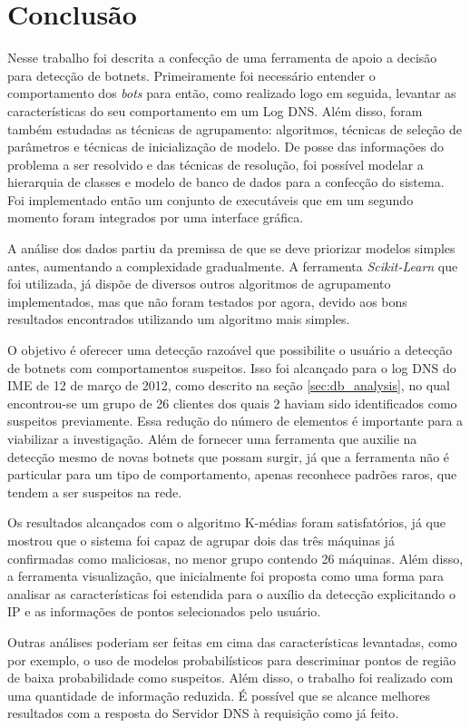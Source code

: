\chapter{Conclusão}

Nesse trabalho foi descrita a confecção de uma ferramenta de apoio a decisão para detecção de botnets. Primeiramente foi necessário entender o comportamento dos \textit{bots} para então, como realizado logo em seguida, levantar as características do seu comportamento em um Log DNS. Além disso, foram também estudadas as técnicas de agrupamento: algoritmos, técnicas de seleção de parâmetros e técnicas de inicialização de modelo. De posse das informações do problema a ser resolvido e das técnicas de resolução, foi possível modelar a hierarquia de classes e modelo de banco de dados para a confecção do sistema. Foi implementado então um conjunto de executáveis que em um segundo momento foram integrados por uma interface gráfica.

A análise dos dados partiu da premissa de que se deve priorizar modelos simples antes, aumentando a complexidade gradualmente. A ferramenta \textit{Scikit-Learn} que foi utilizada, já dispõe de diversos outros algoritmos de agrupamento implementados, mas que não foram testados por agora, devido aos bons resultados encontrados utilizando um algoritmo mais simples.

O objetivo é oferecer uma detecção razoável que possibilite o usuário a detecção de botnets com comportamentos suspeitos. Isso foi alcançado para o log DNS do IME de 12 de março de 2012, como descrito na seção \ref{sec:db_analysis}, no qual encontrou-se um grupo de 26 clientes dos quais 2 haviam sido identificados como suspeitos previamente. Essa redução do número de elementos é importante para a viabilizar a investigação. Além de fornecer uma ferramenta que auxilie na detecção mesmo de novas botnets que possam surgir, já que a ferramenta não é particular para um tipo de comportamento, apenas reconhece padrões raros, que tendem a ser suspeitos na rede.

Os resultados alcançados com o algoritmo K-médias foram satisfatórios, já que mostrou que o sistema foi capaz de agrupar dois das três máquinas já confirmadas como maliciosas, no menor grupo contendo 26 máquinas. Além disso, a ferramenta visualização, que inicialmente foi proposta como uma forma para analisar as características foi estendida para o auxílio da detecção explicitando o IP e as informações de pontos selecionados pelo usuário.

Outras análises poderiam ser feitas em cima das características levantadas, como por exemplo, o uso de modelos probabilísticos para descriminar pontos de região de baixa probabilidade como suspeitos. Além disso, o trabalho foi realizado com uma quantidade de informação reduzida. É possível que se alcance melhores resultados com a resposta do Servidor DNS à requisição como já feito\citep{schonewille2006domain}.